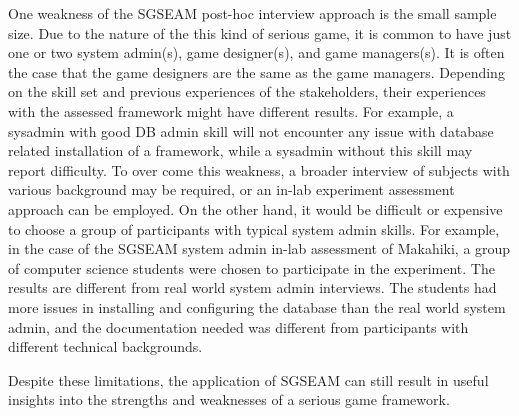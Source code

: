 One weakness of the SGSEAM post-hoc interview approach is the small sample size. Due to the nature of the this kind of serious game, it is common to have just one or two system admin(s), game designer(s), and game managers(s). It is often the case that the game designers are the same as the game managers. Depending on the skill set and previous experiences of the stakeholders, their experiences with the assessed framework might have different results. For example, a sysadmin with good DB admin skill will not encounter any issue with database related installation of a framework, while a sysadmin without this skill may report difficulty. To over come this weakness, a broader interview of subjects with various background may be required, or an in-lab experiment assessment approach can be employed. On the other hand, it would be difficult or expensive to choose a group of participants with typical system admin skills. For example, in the case of the SGSEAM system admin in-lab  assessment of Makahiki, a group of computer science students were chosen to participate in the experiment. The results are different from real world system admin interviews. The students had more issues in installing and configuring the database than the real world system admin, and the documentation needed was different from participants with different technical backgrounds.

Despite these limitations, the application of SGSEAM can still result in useful insights into the strengths and weaknesses of a serious game framework.
